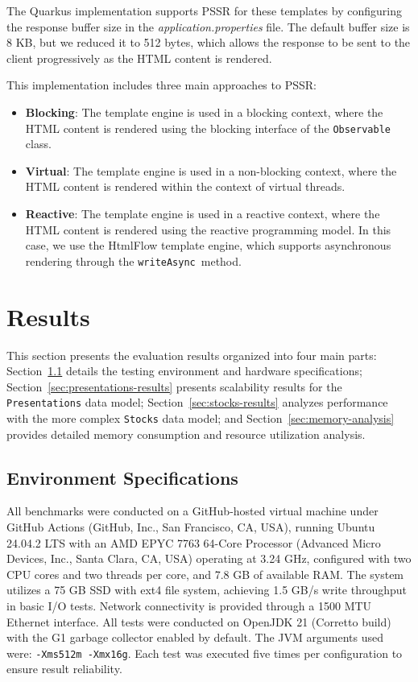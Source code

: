 \documentclass[software,article,accept,pdftex,moreauthors]{Definitions/mdpi}
\begin{document}
The Quarkus implementation supports PSSR for these templates by configuring the
response buffer size in the \textit{application.properties} file. The default
buffer size is 8 KB, but we reduced it to 512 bytes, which allows the response
to be sent to the client progressively as the HTML content is rendered.

This implementation includes three main approaches to PSSR\@:
\begin{itemize}
      \item \textbf{Blocking}: The template engine is used in a blocking context,
            where the HTML content is rendered using the blocking interface of the
            \texttt{Observable} class.
      \item \textbf{Virtual}: The template engine is used in a non-blocking context,
            where the HTML content is rendered within the context of virtual threads.
      \item \textbf{Reactive}: The template engine is used in a reactive context,
            where the HTML content is rendered using the reactive programming model.
            In this case, we use the HtmlFlow template engine, which
            supports asynchronous rendering through the \texttt{writeAsync}~method.
\end{itemize}


\section{Results}\label{s5}

This section presents the evaluation results organized into four main parts:
Section~\ref{sec:environment} details the testing environment and hardware
specifications; Section~\ref{sec:presentations-results} presents scalability
results for the \texttt{Presentations} data model;
Section~\ref{sec:stocks-results} analyzes performance with the more complex
\texttt{Stocks} data model; and Section~\ref{sec:memory-analysis} provides
detailed memory consumption and resource utilization analysis.

\subsection{Environment Specifications}
\label{sec:environment}

All benchmarks were conducted on a GitHub-hosted virtual machine under GitHub
Actions (GitHub, Inc., San Francisco, CA, USA), running Ubuntu 24.04.2 LTS with an AMD EPYC 7763 64-Core Processor
(Advanced Micro Devices, Inc., Santa Clara, CA, USA)
operating at 3.24 GHz, configured with two CPU cores and two
threads per core, and 7.8 GB of available RAM. The system utilizes a 75 GB SSD
with ext4 file system, achieving 1.5 GB/s write throughput in basic I/O tests.
Network connectivity is provided through a 1500 MTU Ethernet interface. All
tests were conducted on OpenJDK 21 (Corretto build) with the G1 garbage
collector enabled by default. The JVM arguments used were: \texttt{-Xms512m
     -Xmx16g}. Each test was executed five times per configuration to ensure result
reliability.
\end{document}
